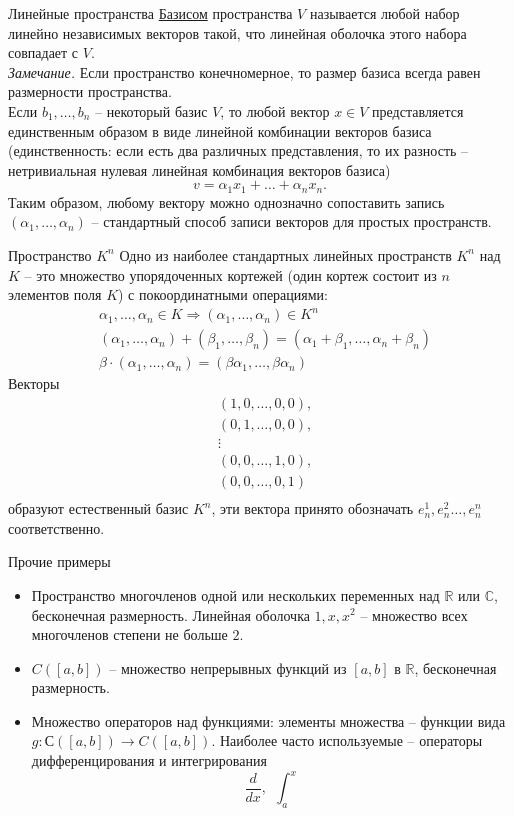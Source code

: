 \documentclass[10pt, handout]{beamer}
\begin{document}
\begin{frame}{Линейные пространства}
\underline{Базисом} пространства $V$ называется любой набор линейно независимых векторов такой, что линейная оболочка этого набора совпадает с $V$.\\
\pause
\textit{Замечание.} Если пространство конечномерное, то размер базиса всегда равен размерности пространства.\\
\pause
\vspace{1em}
Если $b_1, \ldots, b_n$ -- некоторый базис $V$, то любой вектор $x\in V$ представляется единственным образом в виде линейной комбинации векторов базиса (единственность: если есть два различных представления, то их разность -- нетривиальная нулевая линейная комбинация векторов базиса) 
$$
v=\alpha_1x_1+\ldots+\alpha_nx_n.
$$
Таким образом, любому вектору можно однозначно сопоставить запись $(\alpha_1, \ldots, \alpha_n)$ -- стандартный способ записи векторов для простых пространств.
\end{frame}

\begin{frame}{Пространство $K^n$}
Одно из наиболее стандартных линейных пространств $K^n$ над $K$ -- это множество упорядоченных кортежей (один кортеж состоит из $n$ элементов поля $K$) с покоординатными операциями:
\begin{align*}
&\alpha_1, \ldots, \alpha_n\in K\Rightarrow (\alpha_1, \ldots, \alpha_n)\in K^n\\
&(\alpha_1, \ldots, \alpha_n)+(\beta_1, \ldots, \beta_n)=(\alpha_1+\beta_1, \ldots, \alpha_n+\beta_n)\\
&\beta\cdot(\alpha_1, \ldots, \alpha_n)=(\beta\alpha_1, \ldots, \beta\alpha_n)
\end{align*}
\pause
Векторы 
\begin{align*}
&(1, 0, \ldots, 0, 0),\\
&(0, 1, \ldots, 0, 0),\\
&\vdots\\
&(0, 0, \ldots, 1, 0),\\
&(0, 0, \ldots, 0, 1)\\
\end{align*}
образуют естественный базис $K^n$, эти вектора принято обозначать $e_n^1, e_n^2 \ldots, e_n^n$ соответственно.
\end{frame}

\begin{frame}{Прочие примеры}
\begin{itemize}[<+->]
\item Пространство многочленов одной или нескольких переменных над $\mathbb{R}$ или $\mathbb{C}$, бесконечная размерность. Линейная оболочка $1, x, x^2$ -- множество всех многочленов степени не больше $2$.
\item $C([a, b])$ -- множество непрерывных функций из $[a, b]$ в $\mathbb{R}$, бесконечная размерность.
\item Множество операторов над функциями: элементы множества -- функции вида $g:С([a,b])\rightarrow C([a,b])$. Наиболее часто используемые -- операторы дифференцирования и интегрирования
$$
\frac{d}{dx},~~\int_a^x
$$
\end{itemize}
\end{frame}
\end{document}
